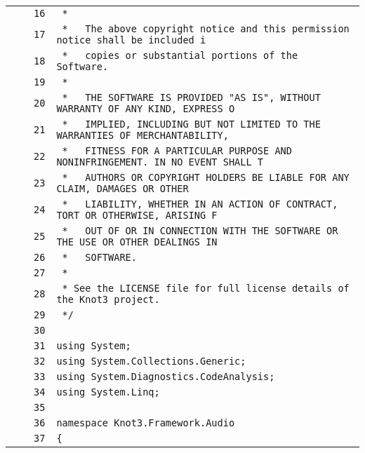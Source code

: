 \documentclass[a4paper,10pt]{article}
\begin{document}
\begin{longtable}[l]{lrrl}
\cellcolor{gray} &  & \verb~16~ & \verb~ *~\\
\cellcolor{gray} &  & \verb~17~ & \verb~ *   The above copyright notice and this permission notice shall be included i~\\
\cellcolor{gray} &  & \verb~18~ & \verb~ *   copies or substantial portions of the Software.~\\
\cellcolor{gray} &  & \verb~19~ & \verb~ *~\\
\cellcolor{gray} &  & \verb~20~ & \verb~ *   THE SOFTWARE IS PROVIDED "AS IS", WITHOUT WARRANTY OF ANY KIND, EXPRESS O~\\
\cellcolor{gray} &  & \verb~21~ & \verb~ *   IMPLIED, INCLUDING BUT NOT LIMITED TO THE WARRANTIES OF MERCHANTABILITY,~\\
\cellcolor{gray} &  & \verb~22~ & \verb~ *   FITNESS FOR A PARTICULAR PURPOSE AND NONINFRINGEMENT. IN NO EVENT SHALL T~\\
\cellcolor{gray} &  & \verb~23~ & \verb~ *   AUTHORS OR COPYRIGHT HOLDERS BE LIABLE FOR ANY CLAIM, DAMAGES OR OTHER~\\
\cellcolor{gray} &  & \verb~24~ & \verb~ *   LIABILITY, WHETHER IN AN ACTION OF CONTRACT, TORT OR OTHERWISE, ARISING F~\\
\cellcolor{gray} &  & \verb~25~ & \verb~ *   OUT OF OR IN CONNECTION WITH THE SOFTWARE OR THE USE OR OTHER DEALINGS IN~\\
\cellcolor{gray} &  & \verb~26~ & \verb~ *   SOFTWARE.~\\
\cellcolor{gray} &  & \verb~27~ & \verb~ *~\\
\cellcolor{gray} &  & \verb~28~ & \verb~ * See the LICENSE file for full license details of the Knot3 project.~\\
\cellcolor{gray} &  & \verb~29~ & \verb~ */~\\
\cellcolor{gray} &  & \verb~30~ & \verb~~\\
\cellcolor{gray} &  & \verb~31~ & \verb~using System;~\\
\cellcolor{gray} &  & \verb~32~ & \verb~using System.Collections.Generic;~\\
\cellcolor{gray} &  & \verb~33~ & \verb~using System.Diagnostics.CodeAnalysis;~\\
\cellcolor{gray} &  & \verb~34~ & \verb~using System.Linq;~\\
\cellcolor{gray} &  & \verb~35~ & \verb~~\\
\cellcolor{gray} &  & \verb~36~ & \verb~namespace Knot3.Framework.Audio~\\
\cellcolor{gray} &  & \verb~37~ & \verb~{~\\

\end{longtable}
\end{document}
